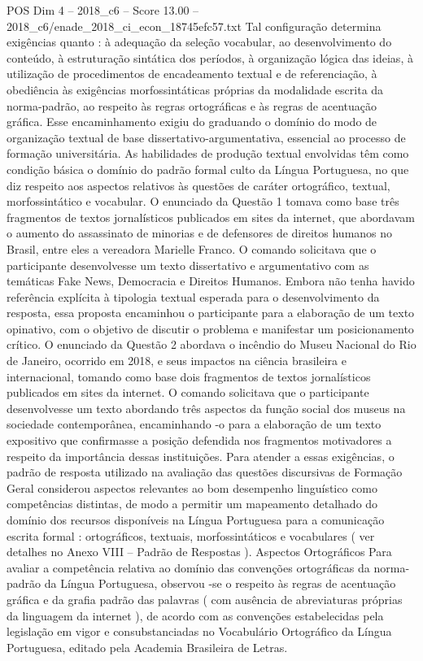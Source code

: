 \begin{textsample}{POS Dim 4 – 2018\_c6 – Score 13.00 – 2018\_c6/enade\_2018\_ci\_econ\_18745efc57.txt}
Tal configuração determina exigências quanto : à adequação da seleção vocabular, ao desenvolvimento do conteúdo, à estruturação sintática dos períodos, à organização lógica das ideias, à utilização de procedimentos de encadeamento textual e de referenciação, à obediência às exigências morfossintáticas próprias da modalidade escrita da norma-padrão, ao respeito às regras ortográficas e às regras de acentuação gráfica.
Esse encaminhamento exigiu do graduando o domínio do modo de organização textual de base dissertativo-argumentativa, essencial ao processo de formação universitária.
As habilidades de produção textual envolvidas têm como condição básica o domínio do padrão formal culto da Língua Portuguesa, no que diz respeito aos aspectos relativos às questões de caráter ortográfico, textual, morfossintático e vocabular.
O enunciado da Questão 1 tomava como base três fragmentos de textos jornalísticos publicados em sites da internet, que abordavam o aumento do assassinato de minorias e de defensores de direitos humanos no Brasil, entre eles a vereadora Marielle Franco.
O comando solicitava que o participante desenvolvesse um texto dissertativo e argumentativo com as temáticas Fake News, Democracia e Direitos Humanos.
Embora não tenha havido referência explícita à tipologia textual esperada para o desenvolvimento da resposta, essa proposta encaminhou o participante para a elaboração de um texto opinativo, com o objetivo de discutir o problema e manifestar um posicionamento crítico.
O enunciado da Questão 2 abordava o incêndio do Museu Nacional do Rio de Janeiro, ocorrido em 2018, e seus impactos na ciência brasileira e internacional, tomando como base dois fragmentos de textos jornalísticos publicados em sites da internet.
O comando solicitava que o participante desenvolvesse um texto abordando três aspectos da função social dos museus na sociedade contemporânea, encaminhando -o para a elaboração de um texto expositivo que confirmasse a posição defendida nos fragmentos motivadores a respeito da importância dessas instituições.
Para atender a essas exigências, o padrão de resposta utilizado na avaliação das questões discursivas de Formação Geral considerou aspectos relevantes ao bom desempenho linguístico como competências distintas, de modo a permitir um mapeamento detalhado do domínio dos recursos disponíveis na Língua Portuguesa para a comunicação escrita formal : ortográficos, textuais, morfossintáticos e vocabulares ( ver detalhes no Anexo VIII – Padrão de Respostas ).
Aspectos Ortográficos Para avaliar a competência relativa ao domínio das convenções ortográficas da norma-padrão da Língua Portuguesa, observou -se o respeito às regras de acentuação gráfica e da grafia padrão das palavras ( com ausência de abreviaturas próprias da linguagem da internet ), de acordo com as convenções estabelecidas pela legislação em vigor e consubstanciadas no Vocabulário Ortográfico da Língua Portuguesa, editado pela Academia Brasileira de Letras.

\end{textsample}
